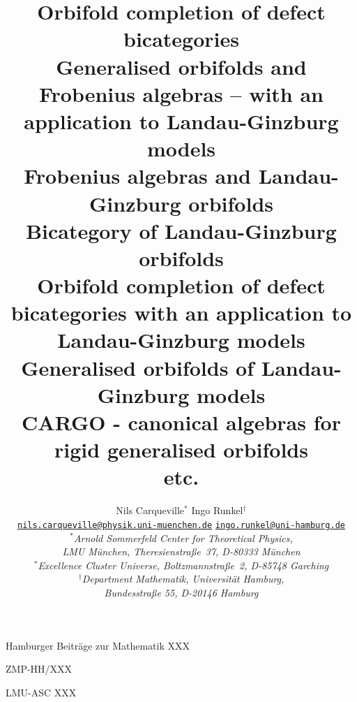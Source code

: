 \documentclass[12pt]{scrartcl}
\theoremstyle{definition}
\numberwithin{equation}{section}
\numberwithin{definition}{section}
\numberwithin{figure}{section}
\begin{document}
\title{
Orbifold completion of defect bicategories
\\[1em]
Generalised orbifolds and Frobenius algebras -- with an application to Landau-Ginzburg models
\\[1em]
Frobenius algebras and Landau-Ginzburg orbifolds
\\[1em]
Bicategory of Landau-Ginzburg orbifolds
\\[1em]
Orbifold completion of defect bicategories with an application to Landau-Ginzburg models
\\[1em]
Generalised orbifolds of Landau-Ginzburg models
\\[1em]
CARGO - canonical algebras for rigid generalised orbifolds
\\[1em]
etc.
}
\author{Nils Carqueville$^*$ \quad Ingo Runkel$^\dagger$
\\[0.5cm]
 \normalsize{\tt \href{mailto:nils.carqueville@physik.uni-muenchen.de}{nils.carqueville@physik.uni-muenchen.de}} \quad
  \normalsize{\tt \href{mailto:ingo.runkel@uni-hamburg.de}{ingo.runkel@uni-hamburg.de}}\\[0.1cm]
  {\normalsize\slshape $^*$Arnold Sommerfeld Center for Theoretical Physics, }\\[-0.1cm]
  {\normalsize\slshape LMU M\"unchen, Theresienstra\ss e~37, D-80333 M\"unchen}\\[-0.1cm]
  {\normalsize\slshape $^*$Excellence Cluster Universe, Boltzmannstra\ss e~2, D-85748 Garching}\\[0.1cm]
  {\normalsize\slshape $^\dagger$Department Mathematik, Universit\"{a}t Hamburg, }\\[-0.1cm]
  {\normalsize\slshape Bundesstra\ss e 55, D-20146 Hamburg}\\[-0.1cm]
}
\date{}
\maketitle

\vspace{-11.8cm}
\hfill {\scriptsize Hamburger Beitr\"age zur Mathematik XXX}

\vspace{-1.0cm}

\hfill {\scriptsize ZMP-HH/XXX}

\vspace{-1.0cm}

\hfill {\scriptsize LMU-ASC XXX}


\vspace{12cm}
\end{document}
